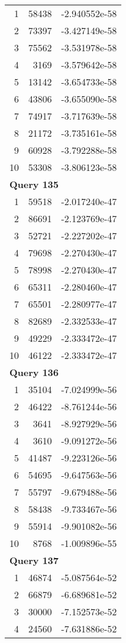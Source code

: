 \begin{longtable}[{p}]{@{}rrp{}@{}}
1 & 58438 & -2.940552e-58 \\
2 & 73397 & -3.427149e-58 \\
3 & 75562 & -3.531978e-58 \\
4 & 3169 & -3.579642e-58 \\
5 & 13142 & -3.654733e-58 \\
6 & 43806 & -3.655090e-58 \\
7 & 74917 & -3.717639e-58 \\
8 & 21172 & -3.735161e-58 \\
9 & 60928 & -3.792288e-58 \\
10 & 53308 & -3.806123e-58 \\
\midrule
\multicolumn{3}{l}{\bfseries Query 135} \\
1 & 59518 & -2.017240e-47 \\
2 & 86691 & -2.123769e-47 \\
3 & 52721 & -2.227202e-47 \\
4 & 79698 & -2.270430e-47 \\
5 & 78998 & -2.270430e-47 \\
6 & 65311 & -2.280460e-47 \\
7 & 65501 & -2.280977e-47 \\
8 & 82689 & -2.332533e-47 \\
9 & 49229 & -2.333472e-47 \\
10 & 46122 & -2.333472e-47 \\
\midrule
\multicolumn{3}{l}{\bfseries Query 136} \\
1 & 35104 & -7.024999e-56 \\
2 & 46422 & -8.761244e-56 \\
3 & 3641 & -8.927929e-56 \\
4 & 3610 & -9.091272e-56 \\
5 & 41487 & -9.223126e-56 \\
6 & 54695 & -9.647563e-56 \\
7 & 55797 & -9.679488e-56 \\
8 & 58438 & -9.733467e-56 \\
9 & 55914 & -9.901082e-56 \\
10 & 8768 & -1.009896e-55 \\
\midrule
\multicolumn{3}{l}{\bfseries Query 137} \\
1 & 46874 & -5.087564e-52 \\
2 & 66879 & -6.689681e-52 \\
3 & 30000 & -7.152573e-52 \\
4 & 24560 & -7.631886e-52 \\

\end{longtable}
